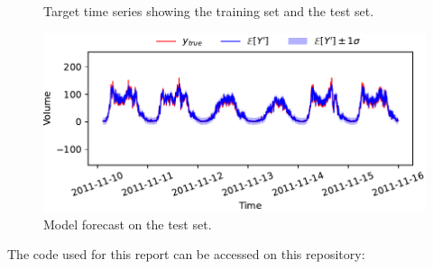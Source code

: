 \documentclass[12pt]{article}
\begin{document}
\begin{enumerate}
\begin{figure}[H]
  \centering
  
  \caption{Target time series showing the training set and the test set.}
  \label{fig:data_split}
\end{figure}

\begin{figure}[H]
  \centering
  \includegraphics[scale=1]{FIG/TAGI_LSTM_Forecast.pdf}
  \caption{Model forecast on the test set.}
  \label{fig:model_forecast}
\end{figure}

The code used for this report can be accessed on this repository:


\end{enumerate}
\end{document}
